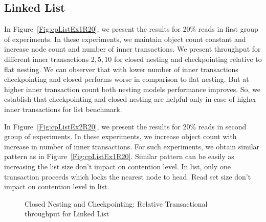 \documentclass[12pt,english]{report}
\begin{document}
\subsection{Linked List}
In Figure~\ref{Fig:cpListEx1R20}, we present the results for 20\% reads in first group of experiments. In these experiments, we maintain object count constant and increase node count and number of inner transactions. We present throughput for different inner transactions ${2, 5, 10}$ for closed nesting and checkpointing relative to flat nesting. We can observer that with lower number of inner transactions checkpointing and closed performs worse in comparison to flat nesting. But at higher inner transaction count both nesting models performance improves. So, we establish that checkpointing and closed nesting are helpful only in case of higher inner transactions for list benchmark.

In Figure~\ref{Fig:cpListEx2R20}, we present the results for 20\% reads in second group of experiments. In these experiments, we increase object count with increase in number of inner transactions. For such experiments, we obtain similar pattern as in Figure~\ref{Fig:cpListEx1R20}. Similar pattern can be easily as increasing the list size don't impact on contention level. In list, only one transaction proceeds which locks the nearest node to head. Read set size don't impact on contention level in list.

\begin{figure}[H]
\centering
{}
\end{figure}
\begin{figure}[H]
\centering
{}
\end{figure}
\begin{figure}[H]
\centering
{}
\caption{Closed Nesting and Checkpointing: Relative Transactional throughput for Linked List}
\label{Fig:cpList}
\end{figure}
\end{document}
